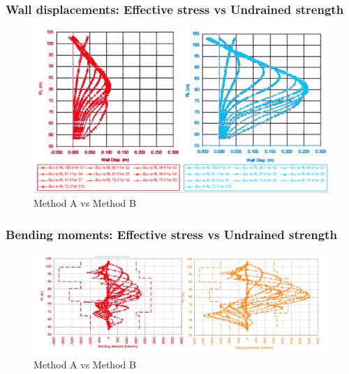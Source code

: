\documentclass[notes]{beamer}
\begin{document}
\begin{frame}
\frametitle{Wall displacements: Effective stress vs Undrained strength}
\begin{figure}[ht]
	\centering
	\includegraphics[width=\textwidth]{figs/wall-disp.png}
	\caption*{Method A vs Method B}
\end{figure}
\end{frame}

\begin{frame}
\frametitle{Bending moments: Effective stress vs Undrained strength}
	\begin{figure}[ht]
		\centering
		\includegraphics[width=\textwidth]{figs/bending-moments.png}
		\caption*{Method A vs Method B}
	\end{figure}
\end{frame}
\end{document}
